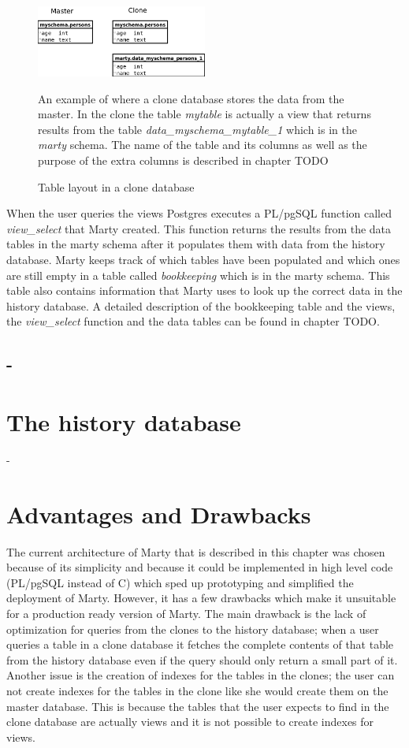 \documentclass[a4paper,12pt,twoside,BCOR=10mm]{scrbook}
\begin{document}
\begin{figure}[h!]
  \centering
    \includegraphics[width=0.5\textwidth]{clone-architecture}
  \caption{Table layout in a clone database}
  \medskip
  \footnotesize
  An example of where a clone database stores the data from the master. In the clone the table \textit{mytable} is actually a view that returns results from the table \textit{data\_myschema\_mytable\_1} which is in the \textit{marty} schema. The name of the table and its columns as well as the purpose of the extra columns is described in chapter TODO
  \label{clone-architecture}
\end{figure}

When the user queries the views Postgres executes a PL/pgSQL function called \textit{view\_select} that Marty created. This function returns the results from the data tables in the marty schema after it populates them with data from the history database. Marty keeps track of which tables have been populated and which ones are still empty in a table called \textit{bookkeeping} which is in the marty schema. This table also contains information that Marty uses to look up the correct data in the history database. A detailed description of the bookkeeping table and the views, the \textit{view\_select} function and the data tables can be found in chapter TODO.

\subsection{-}

\section{The history database}
-

\section{Advantages and Drawbacks}
The current architecture of Marty that is described in this chapter was chosen because of its simplicity and because it could be implemented in high level code (PL/pgSQL instead of C) which sped up prototyping and simplified the deployment of Marty. However, it has a few drawbacks which make it unsuitable for a production ready version of Marty. The main drawback is the lack of optimization for queries from the clones to the history database; when a user queries a table in a clone database it fetches the complete contents of that table from the history database even if the query should only return a small part of it. Another issue is the creation of indexes for the tables in the clones; the user can not create indexes for the tables in the clone like she would create them on the master database. This is because the tables that the user expects to find in the clone database are actually views and it is not possible to create indexes for views.
\end{document}
